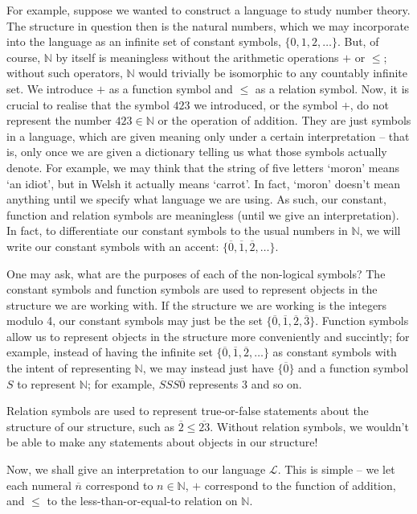\documentclass{article}
\theoremstyle{definition}
\begin{document}
For example, suppose we wanted to construct a language to study number theory. The structure in question then is the natural numbers, which we may incorporate into the language as an infinite set of constant symbols, $\{0,1,2,\dots\}$. But, of course, $\mathbb{N}$ by itself is meaningless without the arithmetic operations $+$ or $\leq$; without such operators, $\mathbb{N}$ would trivially be isomorphic to any countably infinite set. We introduce $+$ as a function symbol and $\leq$ as a relation symbol. Now, it is crucial to realise that the symbol $423$ we introduced, or the symbol $+$, do not represent the number $423\in \mathbb{N}$ or the operation of addition. They are just symbols in a language, which are given meaning only under a certain interpretation -- that is, only once we are given a dictionary telling us what those symbols actually denote. For example, we may think that the string of five letters `moron' means `an idiot', but in Welsh it actually means `carrot'. In fact, `moron' doesn't mean anything until we specify what language we are using. As such, our constant, function and relation symbols are meaningless (until we give an interpretation). In fact, to differentiate our constant symbols to the usual numbers in $\mathbb{N}$, we will write our constant symbols with an accent: $\{\overline{0},\overline{1},\overline{2},\dots\}$.\par

One may ask, what are the purposes of each of the non-logical symbols? The constant symbols and function symbols are used to represent objects in the structure we are working with. If the structure we are working is the integers modulo 4, our constant symbols may just be the set $\{\overline{0},\overline{1},\overline{2},\overline{3}\}$. Function symbols allow us to represent objects in the structure more conveniently and succintly; for example, instead of having the infinite set $\{\overline{0},\overline{1},\overline{2},\dots\}$ as constant symbols with the intent of representing $\mathbb{N}$, we may instead just have $\{\overline{0}\}$ and a function symbol $S$ to represent $\mathbb{N}$; for example, $SSS\overline{0}$ represents 3 and so on.\par

Relation symbols are used to represent true-or-false statements about the structure of our structure, such as $\overline{2}\leq\overline{23}$. Without relation symbols, we wouldn't be able to make any statements about objects in our structure! 

Now, we shall give an interpretation to our language $\mathcal{L}$. This is simple -- we let each numeral $\overline{n}$ correspond to $n\in \mathbb{N}$, $+$ correspond to the function of addition, and $\leq$ to the less-than-or-equal-to relation on $\mathbb{N}$.
\end{document}
